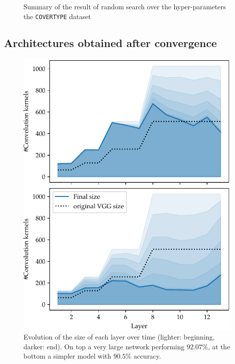 \begin{figure}[t]
\begin{minipage}{2.7in}
\begin{center}
\vspace*{-5mm}
\caption{\label{figure_COVER} Summary of the result of random
search over the hyper-parameters the \texttt{COVERTYPE} dataset
}
\end{center}
\vspace*{-4mm}
\end{minipage}
\end{figure}


\subsection{Architectures obtained after convergence}

\begin{figure}[htb]
\begin{center}
\includegraphics[width=.7\columnwidth]{size_evolution}
\vspace*{-5mm} 
\caption{ Evolution of the size of
  each layer over time (lighter: beginning, darker: end). On top a very large
  network performing $92.07\%$, at the bottom a simpler model with $90.5\%$
  accuracy. 
} 
\label{fig:network_size_evolution}
\end{center}
\vspace*{-4mm}
\end{figure}

